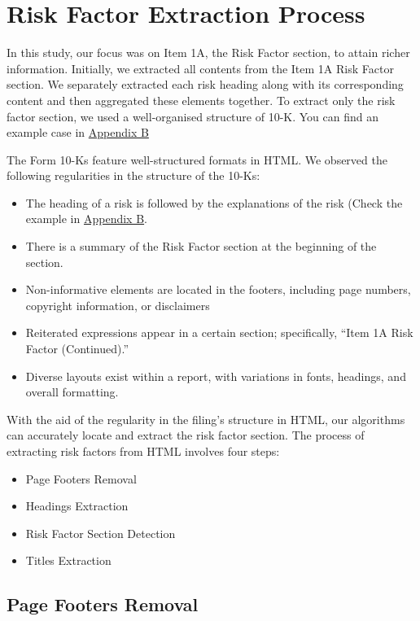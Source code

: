 \documentclass[logo,bsc,singlespacing,parskip]{infthesis}
\begin{document}
\section{Risk Factor Extraction Process}
In this study, our focus was on Item 1A, the Risk Factor section, to attain richer information. Initially, we extracted all contents from the Item 1A Risk Factor section. We separately extracted each risk heading along with its corresponding content and then aggregated these elements together. To extract only the risk factor section, we used a well-organised structure of 10-K. You can find an example case in \hyperref[appendix_nvidia_risk]{Appendix B}

The Form 10-Ks feature well-structured formats in HTML. We observed the following regularities in the structure of the 10-Ks:
\begin{itemize}
    \item The heading of a risk is followed by the explanations of the risk (Check the example in \hyperref[appendix_nvidia_10-k]{Appendix B}.
    \item There is a summary of the Risk Factor section at the beginning of the section.
    \item Non-informative elements are located in the footers, including page numbers, copyright information, or disclaimers
    \item Reiterated expressions appear in a certain section; specifically, “Item 1A Risk Factor (Continued).”
    \item Diverse layouts exist within a report, with variations in fonts, headings, and overall formatting.

\end{itemize}
With the aid of the regularity in the filing’s structure in HTML, our algorithms can accurately locate and extract the risk factor section. The process of extracting risk factors from HTML involves four steps: 
\begin{itemize}
    \item Page Footers Removal
    \item Headings Extraction
    \item Risk Factor Section Detection
    \item Titles Extraction
\end{itemize}

\subsection{Page Footers Removal}
\end{document}
